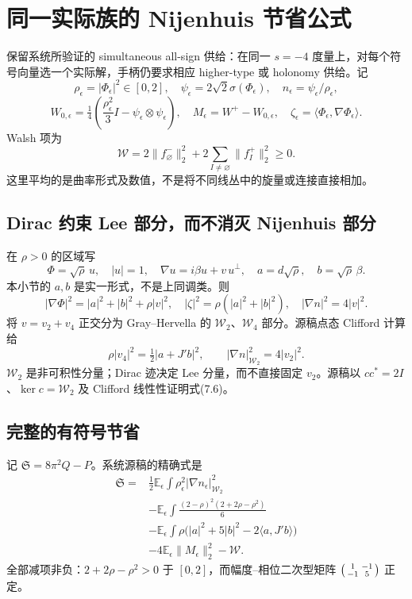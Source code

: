 \documentclass[UTF8,11pt,openany,fontset=none]{ctexbook}
\theoremstyle{definition}
\theoremstyle{remark}
\begin{document}
\section{同一实际族的 Nijenhuis 节省公式}\label{v7-ux540cux4e00ux5b9eux9645ux65cfux7684-nijenhuis-ux8282ux7701ux516cux5f0f}

保留系统所验证的 simultaneous all-sign 供给：在同一 \(s=-4\) 度量上，对每个符号向量选一个实际解，手柄仍要求相应 higher-type 或 holonomy 供给。记 \[
 \rho_\epsilon=|\Phi_\epsilon|^2\in[0,2],\quad
 \psi_\epsilon=2\sqrt2\sigma(\Phi_\epsilon),\quad
 n_\epsilon=\psi_\epsilon/\rho_\epsilon,
\] \[
 W_{0,\epsilon}=\tfrac14\left(\frac{\rho_\epsilon^2}{3}I-
 \psi_\epsilon\otimes\psi_\epsilon\right),\quad
 M_\epsilon=W^+-W_{0,\epsilon},\quad
 \zeta_\epsilon=\langle\Phi_\epsilon,\nabla\Phi_\epsilon\rangle.
\] Walsh 项为 \[
 \mathcal W=2\|f_\varnothing^-\|_2^2+
 2\sum_{I\ne\varnothing}\|f_I^+\|_2^2\ge0.
\] 这里平均的是曲率形式及数值，不是将不同线丛中的旋量或连接直接相加。\cite{B03}

\subsection{Dirac 约束 Lee 部分，而不消灭 Nijenhuis 部分}\label{v7-dirac-ux7ea6ux675f-lee-ux90e8ux5206ux800cux4e0dux6d88ux706d-nijenhuis-ux90e8ux5206}

在 \(\rho>0\) 的区域写 \[
 \Phi=\sqrt\rho\,u,\quad |u|=1,\quad
 \nabla u=i\beta u+v\,u^\perp,
 \quad a=d\sqrt\rho,\quad b=\sqrt\rho\,\beta.
\] 本小节的 \(a,b\) 是实一形式，不是上同调类。则 \[
 |\nabla\Phi|^2=|a|^2+|b|^2+\rho|v|^2,
 \quad|\zeta|^2=\rho(|a|^2+|b|^2),\quad|\nabla n|^2=4|v|^2.
\] 将 \(v=v_2+v_4\) 正交分为 Gray--Hervella 的 \(\mathcal W_2\)、\(\mathcal W_4\) 部分。源稿点态 Clifford 计算给 \[
 \rho|v_4|^2=\tfrac12|a+J'b|^2,
 \qquad |\nabla n|_{\mathcal W_2}^2=4|v_2|^2.
\tag{7.6}
\] \(\mathcal W_2\) 是非可积性分量；Dirac 迹决定 Lee 分量，而不直接固定 \(v_2\)。源稿以 \(cc^*=2I\)、\(\ker c=\mathcal W_2\) 及 Clifford 线性性证明式(7.6)。

\subsection{完整的有符号节省}\label{v7-ux5b8cux6574ux7684ux6709ux7b26ux53f7ux8282ux7701}

记 \(\mathfrak S=8\pi^2Q-P\)。系统源稿的精确式是 \[
 \begin{aligned}
 \mathfrak S={}&\frac12\mathbb E_\epsilon\int
 \rho_\epsilon^2|\nabla n_\epsilon|_{\mathcal W_2}^2\\
 &-\mathbb E_\epsilon\int
 \frac{(2-\rho)^2(2+2\rho-\rho^2)}6\\
 &-\mathbb E_\epsilon\int
 \rho\bigl(|a|^2+5|b|^2-2\langle a,J'b\rangle\bigr)\\
 &-4\mathbb E_\epsilon\|M_\epsilon\|_2^2-\mathcal W.
 \end{aligned}
\tag{7.7}
\] 全部减项非负：\(2+2\rho-\rho^2>0\) 于 \([0,2]\)，而幅度--相位二次型矩阵 \(\begin{psmallmatrix}1&-1\\-1&5\end{psmallmatrix}\) 正定。
\end{document}
